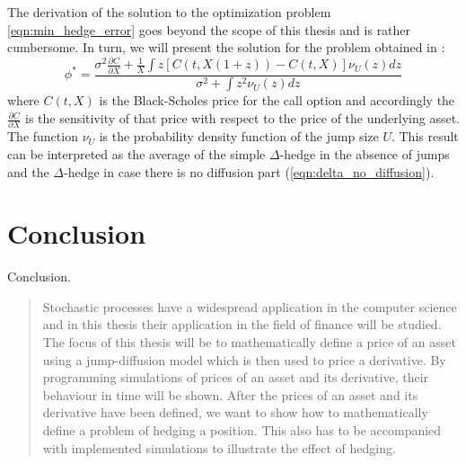 \documentclass[times, utf8, diplomski]{fer}
\begin{document}
\noindent The derivation of the solution to the optimization problem \ref{eqn:min_hedge_error} goes beyond the scope of this thesis and is rather cumbersome. In turn, we will present the solution for the problem obtained in \cite{cont_financial_2004}:
\begin{equation} \label{eqn:quadratic_hedge}
	\phi^* = \frac{\sigma^2 \frac{\partial C}{\partial X} + \frac{1}{X} \int z[C(t,X(1+z))-C(t,X)] \nu_U(z)dz}{\sigma^2 + \int z^2 \nu_U(z)dz}
\end{equation} where $C(t,X)$ is the Black-Scholes price for the call option and accordingly the $\frac{\partial C}{\partial X}$ is the sensitivity of that price with respect to the price of the underlying asset. The function $\nu_U$ is the probability density function of the jump size $U$. This result can be interpreted as the average of the simple $\Delta$-hedge in the absence of jumps and the $\Delta$-hedge in case there is no diffusion part (\ref{eqn:delta_no_diffusion}).

\chapter{Conclusion}
Conclusion.



\nocite{*}

\listoffigures

\newpage
\begin{abstract}
Stochastic processes have a widespread application in the computer science and in this thesis their application in the field of finance will be studied. The focus of this thesis will be to mathematically define a price of an asset using a jump-diffusion model which is then used to price a derivative. By programming simulations of prices of an asset and its derivative, their behaviour in time will be shown. After the prices of an asset and its derivative have been defined, we want to show how to mathematically define a problem of hedging a position. This also has to be accompanied with implemented simulations to illustrate the effect of hedging.

\end{abstract}
\end{document}
